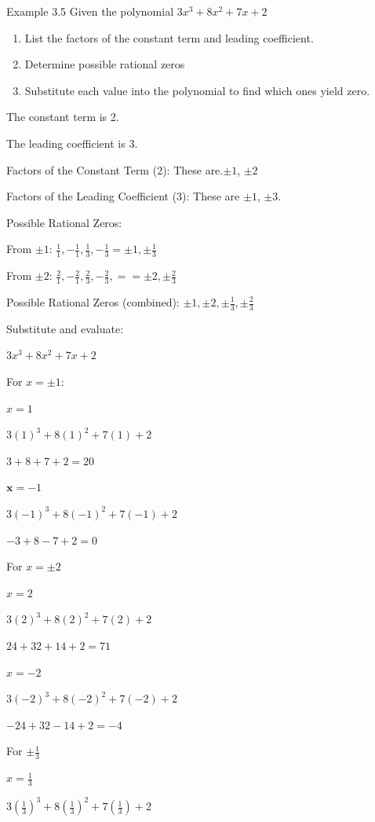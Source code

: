 \begin{example}{Example 3.5}
Given the polynomial $3x^3 + 8x^2 + 7x + 2$
\begin{enumerate}
  \item List the factors of the constant term and leading coefficient.
  \item Determine possible rational zeros
  \item Substitute each value into the polynomial to find which ones yield zero.
\end{enumerate}

\solution
The constant term is 2.

The leading coefficient is 3.

Factors of the Constant Term (2): These are.$\pm 1$, $\pm 2$

Factors of the Leading Coefficient (3): These are $\pm 1$, $\pm 3$.

Possible Rational Zeros:

From $\pm 1$: $\frac{1}{1}, -\frac{1}{1}, \frac{1}{3}, -\frac{1}{3} = \pm 1,
\pm\frac{1}{3}$

From $\pm 2$: $\frac{2}{1}, -\frac{2}{1}, \frac{2}{3}, -\frac{2}{3}, = = \pm 2,
\pm\frac{2}{3}$

Possible Rational Zeros (combined): $\pm 1, \pm 2, \pm\frac{1}{3}, \pm\frac{2}{3}$

Substitute and evaluate:

$3x^3 + 8x^2 + 7x + 2$

For $x = \pm 1$:

$x = 1$

$3(1)^3 + 8(1)^2 + 7(1) + 2$

$3 + 8 + 7 + 2 = 20$

$\boldsymbol{x} = -1$

$3(-1)^3 + 8(-1)^2 + 7(-1) + 2$

$-3 + 8 - 7 + 2 = 0$

For $x = \pm 2$

$x = 2$

$3(2)^3 + 8(2)^2 + 7(2) + 2$

$24 + 32 + 14 + 2 = 71$

$x = -2$

$3(-2)^3 + 8(-2)^2 + 7(-2) + 2$

$-24 + 32 - 14 + 2 = -4$

For $\pm\frac{1}{3}$

$x = \frac{1}{3}$

$3\left(\frac{1}{3}\right)^3 + 8\left(\frac{1}{3}\right)^2 + 7\left(\frac{1}{3}\right) + 2$


\end{example}
